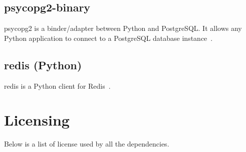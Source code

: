 \subsection{psycopg2-binary}
psycopg2 is a binder/adapter between Python and PostgreSQL\@. It allows any Python
application to connect to a PostgreSQL database instance~\parencite{psycopg2}.

\subsection{redis (Python)}
redis is a Python client for Redis~\parencite{python-redis}.

\section{Licensing}
Below is a list of license used by all the dependencies.
